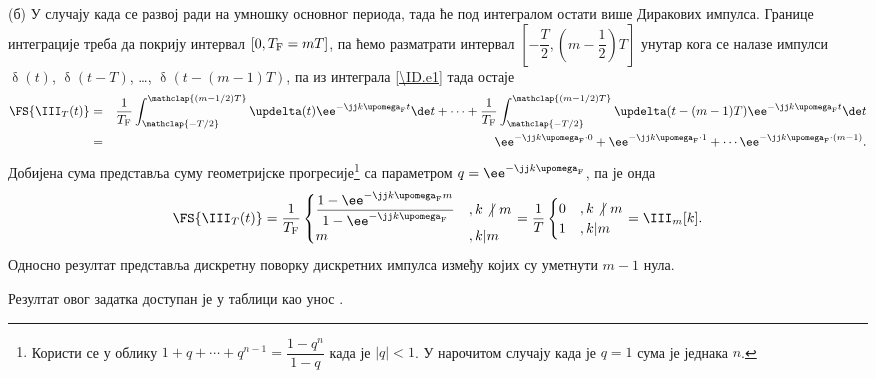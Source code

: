 (б) У случају када се развој ради на умношку основног периода, тада ће под интегралом остати више Диракових импулса. 
Границе интеграције треба да покрију интервал $[0, T_{\rm F} = mT]$, па ћемо разматрати интервал 
$\left[-\dfrac{T}{2}, \left(m -\dfrac{1}{2}\right) T \right]$ унутар кога се налазе импулси 
$\updelta(t)$, $\updelta(t - T)$, \ldots, $\updelta(t - (m-1)T)$, па из интеграла \eqref{\ID.e1} тада остаје 
\begin{eqnarray}
    \FS{\III_{T}(t)} &=& \dfrac{1}{T_{\rm F}} 
    \int_{\mathclap{-T/2}}^{\mathclap{(m-1/2)T}} \updelta(t) \ee^{-\jj k \upomega_{\rm F} t} \de t
    + \cdots + 
    \dfrac{1}{T_{\rm F}} 
    \int_{\mathclap{-T/2}}^{\mathclap{(m-1/2)T}} \updelta(t - (m-1)T) \ee^{-\jj k \upomega_{\rm F} t} \de t \\
    &=&
    \ee^{-\jj k \upomega_{\rm F} \cdot 0} +\ee^{-\jj k \upomega_{\rm F} \cdot 1} +
    \cdots \ee^{-\jj k \upomega_{\rm F} \cdot (m-1)}. 
\end{eqnarray}
Добијена сума представља суму геометријске прогресије\footnote{Користи се у облику 
$1 + q + \cdots + q^{n-1} = \dfrac{1 - q^n}{1-q}$ када је $|q|<1$. У нарочитом случају када је 
$q = 1$ сума је једнака $n$.} са параметром $q = \ee^{-\jj k \upomega_{\rm F}}$, па је онда 
\begin{equation}
    \FS{\III_{T}(t)} = \dfrac{1}{T_{\rm F}}   
    \begin{cases}
        \dfrac{1 - \ee^{-\jj k \upomega_{\rm F}m}}{1-\ee^{-\jj k \upomega_{\rm F}}}  &, k\not |\ m \\ 
        m &, k \vert m  \\ 
    \end{cases}
    = \dfrac{1}{T}
    \begin{cases}
        0 &, k\not |\ m \\ 
        1 &, k \vert m  \\         
    \end{cases}
    = 
    \III_m[k].
\end{equation}
Односно резултат представља дискретну поворку дискретних импулса између којих су уметнути $m-1$ нула. 

Резултат овог задатка доступан је у таблици као унос .